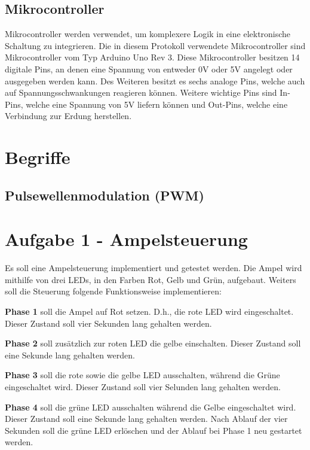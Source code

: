 \documentclass[11pt]{article}
\begin{document}
    \subsection{Mikrocontroller \cite{arduino-r3}}
    \label{subsec:mikrocontroller}

    Mikrocontroller werden verwendet, um komplexere Logik in eine elektronische Schaltung zu integrieren.
    Die in diesem Protokoll verwendete Mikrocontroller sind Mikrocontroller vom Typ Arduino Uno Rev 3.
    Diese Mikrocontroller besitzen 14 digitale Pins, an denen eine Spannung von entweder 0V oder 5V angelegt oder ausgegeben werden kann.
    Des Weiteren besitzt es sechs analoge Pins, welche auch auf Spannungsschwankungen reagieren können.
    Weitere wichtige Pins sind In-Pins, welche eine Spannung von 5V liefern können und Out-Pins, welche eine Verbindung zur Erdung herstellen.

    \section{Begriffe}
    \label{sec:begriffe}

    \subsection{Pulsewellenmodulation (PWM)}
    \label{subsec:pulsewellenmodulation-(pwm)}


    \section{Aufgabe 1 - Ampelsteuerung}
    \label{sec:aufgabe-1}

    Es soll eine Ampelsteuerung implementiert und getestet werden.
    Die Ampel wird mithilfe von drei LEDs, in den Farben Rot, Gelb und Grün, aufgebaut.
    Weiters soll die Steuerung folgende Funktionsweise implementieren:

    \textbf{Phase 1} soll die Ampel auf Rot setzen.
    D.h., die rote LED wird eingeschaltet.
    Dieser Zustand soll vier Sekunden lang gehalten werden.

    \textbf{Phase 2} soll zusätzlich zur roten LED die gelbe einschalten.
    Dieser Zustand soll eine Sekunde lang gehalten werden.

    \textbf{Phase 3} soll die rote sowie die gelbe LED ausschalten, während die Grüne eingeschaltet wird.
    Dieser Zustand soll vier Selunden lang gehalten werden.

    \textbf{Phase 4} soll die grüne LED ausschalten während die Gelbe eingeschaltet wird.
    Dieser Zustand soll eine Sekunde lang gehalten werden.
    Nach Ablauf der vier Sekunden soll die grüne LED erlöschen und der Ablauf bei Phase 1 neu gestartet werden.
\end{document}
